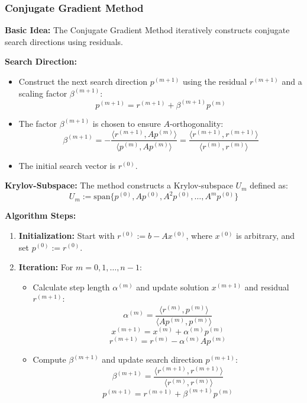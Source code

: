 \documentclass[unicode,11pt,a4paper,oneside,numbers=endperiod,openany]{scrartcl}
\begin{document}
\subsubsection{Conjugate Gradient Method}

\textbf{Basic Idea:}
The Conjugate Gradient Method iteratively constructs conjugate search directions using residuals.

\textbf{Search Direction:}
\begin{itemize}
    \item Construct the next search direction \( p^{(m+1)} \) using the residual \( r^{(m+1)} \) and a scaling factor \( \beta^{(m+1)} \):
    \[ p^{(m+1)} = r^{(m+1)} + \beta^{(m+1)} p^{(m)} \]
    \item The factor \( \beta^{(m+1)} \) is chosen to ensure \( A \)-orthogonality:
    \[ \beta^{(m+1)} = -\frac{\langle r^{(m+1)}, Ap^{(m)} \rangle}{\langle p^{(m)}, Ap^{(m)} \rangle} = \frac{\langle r^{(m+1)}, r^{(m+1)} \rangle}{\langle r^{(m)}, r^{(m)} \rangle} \]
    \item The initial search vector is \( r^{(0)} \).
\end{itemize}

\textbf{Krylov-Subspace:}
The method constructs a Krylov-subspace \( U_m \) defined as:
\[ U_m := \text{span}\{p^{(0)}, Ap^{(0)}, A^2p^{(0)}, \ldots, A^mp^{(0)}\} \]

\textbf{Algorithm Steps:}
\begin{enumerate}
    \item \textbf{Initialization:} Start with \( r^{(0)} := b - Ax^{(0)} \), where \( x^{(0)} \) is arbitrary, and set \( p^{(0)} := r^{(0)} \).
    \item \textbf{Iteration:} For \( m = 0, 1, \ldots, n-1 \):
    \begin{itemize}
        \item Calculate step length \( \alpha^{(m)} \) and update solution \( x^{(m+1)} \) and residual \( r^{(m+1)} \):
        \[ \alpha^{(m)} = \frac{\langle r^{(m)}, p^{(m)} \rangle}{\langle Ap^{(m)}, p^{(m)} \rangle} \]
        \[ x^{(m+1)} = x^{(m)} + \alpha^{(m)} p^{(m)} \]
        \[ r^{(m+1)} = r^{(m)} - \alpha^{(m)} Ap^{(m)} \]
        \item Compute \( \beta^{(m+1)} \) and update search direction \( p^{(m+1)} \):
        \[ \beta^{(m+1)} = \frac{\langle r^{(m+1)}, r^{(m+1)} \rangle}{\langle r^{(m)}, r^{(m)} \rangle} \]
        \[ p^{(m+1)} = r^{(m+1)} + \beta^{(m+1)} p^{(m)} \]
    \end{itemize}
\end{enumerate}
\end{document}
